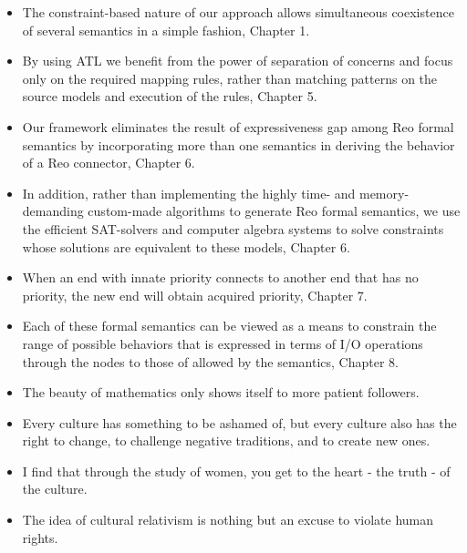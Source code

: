 \begin{itemize}
\item The constraint-based nature of our approach
allows simultaneous coexistence of several semantics in a simple fashion, Chapter 1.
\item By using ATL we benefit from the power of separation of concerns and focus
only on the required mapping rules, rather than matching patterns on the source
models and execution of the rules, Chapter 5.
\item Our framework eliminates the result of expressiveness gap among Reo formal
semantics by incorporating more than one semantics in deriving the behavior
of a Reo connector, Chapter 6.
\item In
addition, rather than implementing the highly time- and memory-demanding
custom-made algorithms to generate Reo formal semantics, we use the efficient
SAT-solvers and computer algebra systems to solve constraints whose solutions
are equivalent to these models, Chapter 6.
\item When an end with innate
priority connects to another end that has no priority, the new end will obtain
acquired priority, Chapter 7.
\item Each of these formal semantics can be viewed as a means to constrain the
range of possible behaviors that is expressed in terms of I/O operations through
the nodes to those of allowed by the semantics, Chapter 8.
\item The beauty of mathematics only shows itself to more patient followers.
\item Every culture has something to be ashamed of, but every culture also has the right to change, to challenge negative traditions, and to create new ones.
\item I find that through the study of women, you get to the heart - the truth - of the culture.
\item The idea of cultural relativism is nothing but an excuse to violate human rights.
\end{itemize}